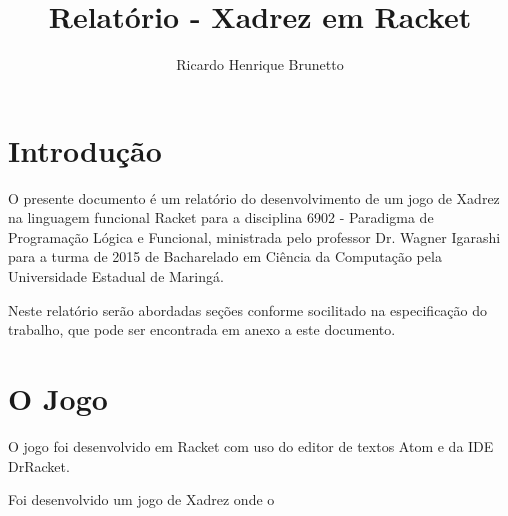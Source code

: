 

\sloppy

\title{Relatório - Xadrez em Racket}

\author{Ricardo Henrique Brunetto}


\address{Departamento de Informática -- Universidade Estadual de Maringá (UEM)\\
	Maringá -- PR -- Brasil
}



	\maketitle

	\resumo{}

  \section{Introdução}
	O presente documento é um relatório do desenvolvimento de um jogo de Xadrez na
	linguagem funcional Racket para a disciplina 6902 - Paradigma de Programação Lógica
	e Funcional, ministrada pelo professor Dr. Wagner Igarashi para a turma de 2015
	de Bacharelado em Ciência da Computação pela Universidade Estadual de Maringá.

	Neste relatório serão abordadas seções conforme socilitado na especificação do trabalho,
	que pode ser encontrada em anexo a este documento.

	\section{O Jogo}
	O jogo foi desenvolvido em Racket com uso do editor de textos Atom e da IDE DrRacket.

	Foi desenvolvido um jogo de Xadrez onde o 

	
	

	


